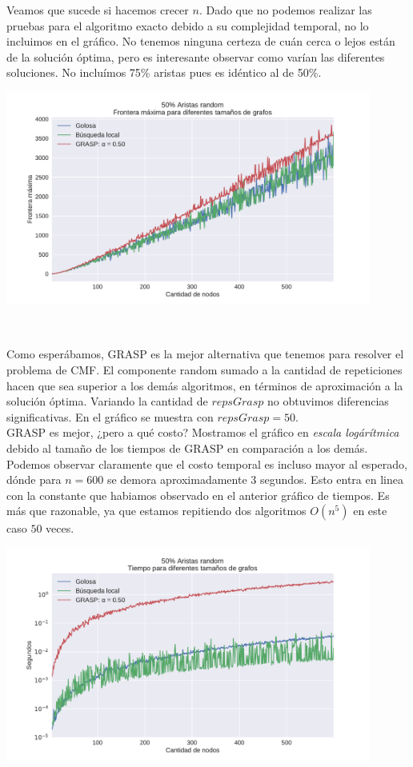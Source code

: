 Veamos que sucede si hacemos crecer $n$. Dado que no podemos realizar las pruebas para el algoritmo exacto debido a su complejidad temporal, no lo incluimos en el gráfico. No tenemos ninguna certeza de cuán cerca o lejos están de la solución óptima, pero es interesante observar como varían las diferentes soluciones. No incluímos 75\% aristas pues es idéntico al de 50\%. \\

{\centering
    \includegraphics[width=0.9\textwidth]{informe/imgs/exp_random50_frontera_todos_ngrande.pdf}

}
$ $ \newline

Como esperábamos, GRASP es la mejor alternativa que tenemos para resolver el problema de CMF. El componente random sumado a la cantidad de repeticiones hacen que sea superior a los demás algoritmos, en términos de aproximación a la solución óptima. Variando la cantidad de $repsGrasp$ no obtuvimos diferencias significativas. En el gráfico se muestra con $repsGrasp = 50$. \\

GRASP es mejor, ¿pero a qué costo? Mostramos el gráfico en \textit{escala logárítmica} debido al tamaño de los tiempos de GRASP en comparación a los demás. Podemos observar claramente que el costo temporal es incluso mayor al esperado, dónde para $n = 600$ se demora aproximadamente 3 segundos. Esto entra en linea con la constante que habiamos observado en el anterior gráfico de tiempos. Es más que razonable, ya que estamos repitiendo dos algoritmos $O(n^5)$ en este caso $50$ veces. \\

{\centering
    \includegraphics[width=0.9\textwidth]{informe/imgs/exp_random50_tiempo_todos_ngrande_logy.pdf}

}
$ $ \newline

